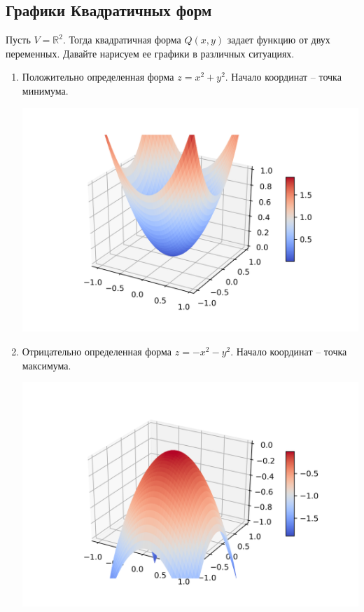 \subsection{Графики Квадратичных форм}

Пусть $V = \mathbb R^2$. Тогда квадратичная форма $Q(x, y)$ задает функцию от двух переменных. Давайте нарисуем ее графики в различных ситуациях.

\begin{enumerate}
\item Положительно определенная форма $z = x^2 + y^2$. Начало координат -- точка минимума.

\includegraphics[scale = 0.5]{Figures/graph_positive.png}

\item Отрицательно определенная форма $z = - x^2 - y^2$. Начало координат -- точка максимума.

\includegraphics[scale = 0.5]{Figures/graph_negative.png}


\end{enumerate}
